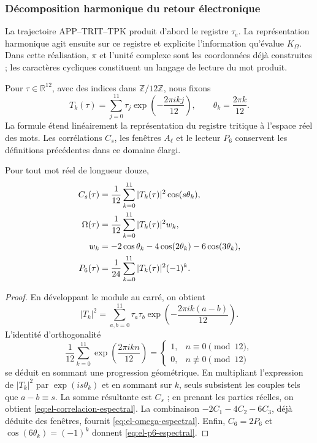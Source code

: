 \subsubsection{Décomposition harmonique du retour électronique}
\label{sec:el-espectro-retorno}

La trajectoire APP--TRIT--TPK produit d'abord le registre \(\tau_e\). La représentation harmonique agit ensuite sur ce registre et explicite l'information qu'évalue \(K_\Omega\). Dans cette réalisation, \(\pi\) et l'unité complexe sont les coordonnées déjà construites ; les caractères cycliques constituent un langage de lecture du mot produit.

Pour \(\tau\in\mathbb R^{12}\), avec des indices dans
\(\mathbb Z/12\mathbb Z\), nous fixons
\begin{equation}
 T_k(\tau)=\sum_{j=0}^{11}\tau_j
             \exp\!\left(-\frac{2\pi i kj}{12}\right),\qquad
 \theta_k=\frac{2\pi k}{12}.
 \label{eq:el-transformada-finita}
\end{equation}
La formule étend linéairement la représentation du registre
tritique à l'espace réel des mots. Les corrélations \(C_s\),
les fenêtres \(A_\ell\) et le lecteur \(P_6\) conservent les
définitions précédentes dans ce domaine élargi.

\begin{theorem}
\label{thm:el-lector-espectral}
Pour tout mot réel de longueur douze,
\begin{align}
 C_s(\tau)&=\frac1{12}\sum_{k=0}^{11}|T_k(\tau)|^2
                         \cos(s\theta_k),
 \label{eq:el-correlacion-espectral}\\
 \Omega(\tau)&=\frac1{12}\sum_{k=0}^{11}|T_k(\tau)|^2w_k,
 \label{eq:el-omega-espectral}\\
 w_k&=-2\cos\theta_k-4\cos(2\theta_k)-6\cos(3\theta_k),\notag\\
 P_6(\tau)&=\frac1{24}\sum_{k=0}^{11}|T_k(\tau)|^2(-1)^k.
 \label{eq:el-p6-espectral}
\end{align}
\end{theorem}
\begin{proof}
En développant le module au carré, on obtient
\[
 |T_k|^2=\sum_{a,b=0}^{11}\tau_a\tau_b
           \exp\!\left(-\frac{2\pi i k(a-b)}{12}\right).
\]
L'identité d'orthogonalité
\[
 \frac1{12}\sum_{k=0}^{11}
       \exp\!\left(\frac{2\pi i k n}{12}\right)
 =\begin{cases}1,&n\equiv0\pmod{12},\\0,&n\not\equiv0\pmod{12}
   \end{cases}
\]
se déduit en sommant une progression géométrique. En multipliant
l'expression de \(|T_k|^2\) par \(\exp(is\theta_k)\) et en sommant sur
\(k\), seuls subsistent les couples tels que \(a-b\equiv s\).
La somme résultante est \(C_s\) ; en prenant les parties réelles, on obtient
\eqref{eq:el-correlacion-espectral}. La combinaison
\(-2C_1-4C_2-6C_3\), déjà déduite des fenêtres, fournit
\eqref{eq:el-omega-espectral}. Enfin,
\(C_6=2P_6\) et \(\cos(6\theta_k)=(-1)^k\) donnent
\eqref{eq:el-p6-espectral}.
\end{proof}

